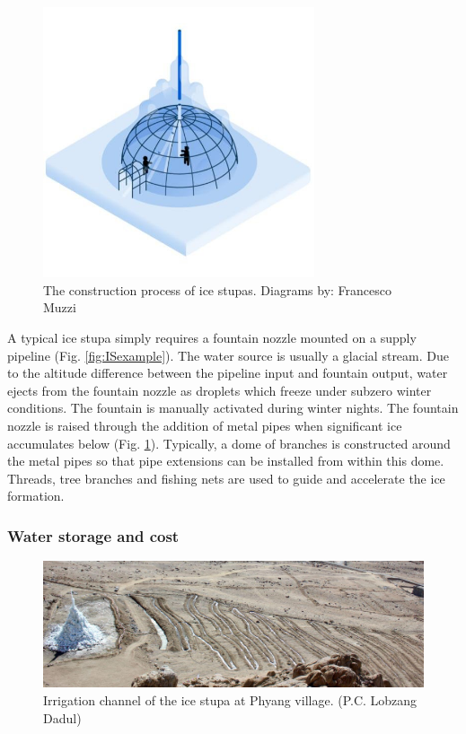 \begin{figure}[htb]
\centering
\includegraphics[width=8cm]{figs/IS_science.jpg}
\caption{The construction process of ice stupas. Diagrams by: Francesco Muzzi }
\label{fig:ISconstruction}
\end{figure}

A typical ice stupa simply requires a fountain nozzle mounted on a supply pipeline (Fig. \ref{fig:ISexample}).
The water source is usually a glacial stream. Due to the altitude difference between the pipeline input and
fountain output, water ejects from the fountain nozzle as droplets which freeze under subzero winter conditions.
The fountain is manually activated during winter nights. The fountain nozzle is raised through the addition of
metal pipes when significant ice accumulates below (Fig. \ref{fig:ISconstruction}). Typically, a dome of
branches is constructed around the metal pipes so that pipe extensions can be installed from within this dome.
Threads, tree branches and fishing nets are used to guide and accelerate the ice formation.

\subsubsection{Water storage and cost}

\begin{figure}[htb]
\centering
\includegraphics[width=\textwidth]{figs/IS_irrigation.jpeg}
\caption{Irrigation channel of the ice stupa at Phyang village. (P.C. Lobzang Dadul) }
\label{fig:ISirrigation}
\end{figure}


